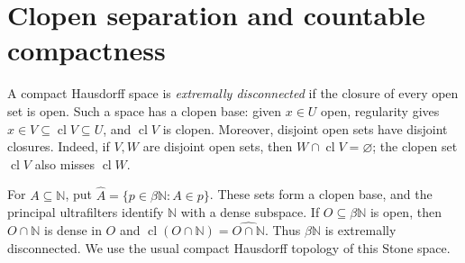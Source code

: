 \documentclass[11pt]{article}
\newcommand{\N}{\mathbb N}
\newcommand{\cl}{\operatorname{cl}}
\newcommand{\hatset}[1]{\widehat{#1}}
\begin{document}
\section{Clopen separation and countable compactness}
A compact Hausdorff space is \emph{extremally disconnected} if the
closure of every open set is open. Such a space has a clopen base:
given $x\in U$ open, regularity gives $x\in V\subseteq\cl V\subseteq U$,
and $\cl V$ is clopen. Moreover, disjoint open sets have disjoint
closures. Indeed, if $V,W$ are disjoint open sets, then
$W\cap\cl V=\varnothing$; the clopen set $\cl V$ also misses $\cl W$.

For $A\subseteq\N$, put
$\hatset A=\{p\in\beta\N:A\in p\}$. These sets form a clopen base,
and the principal ultrafilters identify $\N$ with a dense subspace.
If $O\subseteq\beta\N$ is open, then $O\cap\N$ is dense in $O$ and
$\cl(O\cap\N)=\hatset{O\cap\N}$. Thus $\beta\N$ is extremally
disconnected. We use the usual compact Hausdorff topology of this
Stone space.
\end{document}
